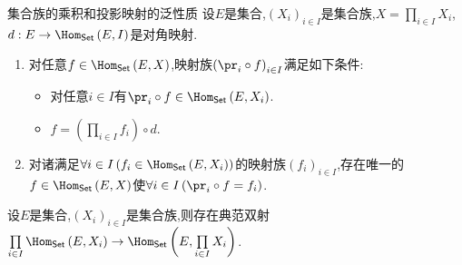 \begin{proposition}{集合族的乘积和投影映射的泛性质}{}
	设$E$是集合,$\left(X_{i}\right)_{i\in I}$是集合族,$X=\prod\limits_{i\in I}X_{i}$,$d:E\to\Hom_{\mathsf{Set}}\left(E,I\right)$是对角映射.
	\begin{enumerate}
		\item 对任意$f\in\Hom_{\mathsf{Set}}\left(E,X\right)$,映射族$\left(\pr_{i}\circ f\right)_{i\in I}$满足如下条件:
		\begin{itemize}
			\item 对任意$i\in I$有$\pr_{i}\circ f\in\Hom_{\mathsf{Set}}\left(E,X_{i}\right)$.
			\item $f=\left(\prod\limits_{i\in I}f_{i}\right)\circ d$.
		\end{itemize}
		\item 对诸满足$\forall i\in I\left(f_{i}\in\Hom_{\mathsf{Set}}\left(E,X_{i}\right)\right)$的映射族$\left(f_{i}\right)_{i\in I}$,存在唯一的$f\in\Hom_{\mathsf{Set}}\left(E,X\right)$使$\forall i\in I\left(\pr_{i}\circ f=f_{i}\right)$.
		\begin{center}
		\end{center}
	\end{enumerate}
\end{proposition}

\begin{corollary}{}{}
	设$E$是集合,$\left(X_{i}\right)_{i\in I}$是集合族,则存在典范双射$\prod\limits_{i\in I}\Hom_{\mathsf{Set}}\left(E,X_{i}\right)\to\Hom_{\mathsf{Set}}\left(E,\prod\limits_{i\in I}X_{i}\right)$.
\end{corollary}






















